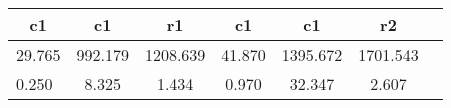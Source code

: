\begin{table}[htbp]
\begin{tabular}{lcccccc} \hline \hline
 \multicolumn{1}{c}{ c1 }  & c1  & r1  & c1  & c1  & r2  \\  \hline 
   29.765 &   992.179 &  1208.639 &    41.870 &  1395.672 &  1701.543 \\  
    0.250 &     8.325 &     1.434 &     0.970 &    32.347 &     2.607 \\  
\hline \hline \end{tabular}
\end{table}
